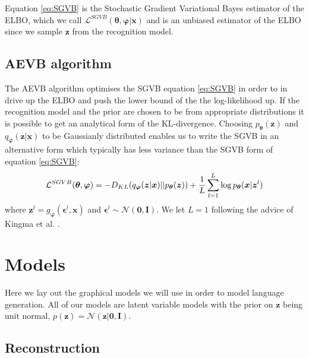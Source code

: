 Equation \eqref{eq:SGVB} is the Stochastic Gradient Variational Bayes estimator
of the ELBO, which we call $\mathcal{L}^{SGVB}(\bm{\theta}, \bm{\varphi}|
\bm{x})$ and is an unbiased estimator of the ELBO since we sample $\bm{z}$ from
the recognition model.

\subsection{AEVB algorithm}
The AEVB algorithm optimises the SGVB equation \eqref{eq:SGVB} in order to in
drive up the ELBO and push the lower bound of the the log-likelihood up. If the
recognition model and the prior are chosen to be from appropriate distributions
it is possible to get an analytical form of the KL-divergence. Choosing
$p_{\bm{\theta}}(\bm{z})$ and $q_{\bm{\varphi}}(\bm{z} | \bm{x})$ to be
Gaussianly distributed enables us to write the SGVB in an alternative form which
typically has less variance than the SGVB form of equation \eqref{eq:SGVB}:
\begin{equation}
  \label{eq:SGVB_analytical_KL}
  \mathcal{L}^{SGVB}(\bm{\theta}, \bm{\varphi}) = -D_{KL}(q_{\bm{\varphi}}(\bm{z} | \bm{x}) || p_{\bm{\theta}}(\bm{z})) + \frac{1}{L} \sum_{l=1}^L \log p_{\bm{\theta}}(\bm{x} | \bm{z}^{l})
\end{equation}
where $\bm{z}^{l} = g_{\bm{\varphi}}(\bm{\epsilon}^{l}, \bm{x})$ and
$\bm{\epsilon}^{l} \sim \mathcal{N}(\bm{0},
\bm{I})$. We let $L = 1$ following the advice
of Kingma et al. \cite{kingma_auto-encoding_2013}.

\section{Models}

Here we lay out the graphical models we will use in order to model language
generation. All of our models are latent variable models with the prior on
$\bm{z}$ being unit normal, $p(\bm{z}) = \mathcal{N}(\bm{z}| \bm{0}, \bm{I})$.

\subsection{Reconstruction}

